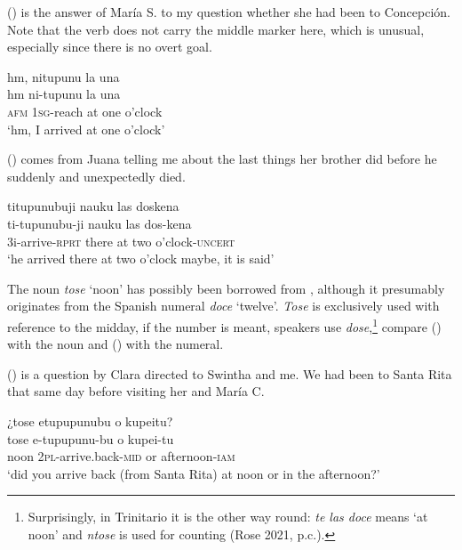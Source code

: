 () is the answer of María S. to my question whether she had been to Concepción. Note that the verb does not carry the middle marker here, which is unusual, especially since there is no overt goal.

\ea\label{ex:num-time-1}
\begingl
\glpreamble hm, nitupunu la una\\
\gla hm ni-tupunu {la una}\\
\glb \textsc{afm} 1\textsc{sg}-reach {at one o’clock}\\
\glft ‘hm, I arrived at one o’clock’
\endgl
\trailingcitation{[rxx-e120511l.002]}
\xe

() comes from Juana telling me about the last things her brother did before he suddenly and unexpectedly died.

\newpage

\ea\label{ex:num-time-2}
\begingl
\glpreamble titupunubuji nauku las doskena\\
\gla ti-tupunubu-ji nauku {las dos}-kena\\
\glb 3i-arrive-\textsc{rprt} there {at two o’clock}-\textsc{uncert}\\
\glft ‘he arrived there at two o’clock maybe, it is said’
\endgl
\trailingcitation{[jxx-p120430l-2.404]}
\xe

The noun \textit{tose} ‘noon’ has possibly been borrowed from , although it presumably originates from the Spanish numeral \textit{doce} ‘twelve’. \textit{Tose} is exclusively used with reference to the midday, if the number is meant, speakers use \textit{dose},\footnote{Surprisingly, in Trinitario it is the other way round: \textit{te las doce} means ‘at noon’ and \textit{ntose} is used for counting (Rose 2021, p.c.).} compare () with the noun and () with the numeral.

() is a question by Clara directed to Swintha and me. We had been to Santa Rita that same day before visiting her and María C.

\ea\label{ex:twelve-1}
\begingl
\glpreamble ¿tose etupupunubu o kupeitu?\\
\gla tose e-tupupunu-bu o kupei-tu\\
\glb noon 2\textsc{pl}-arrive.back-\textsc{mid} or afternoon-\textsc{iam}\\
\glft ‘did you arrive back (from Santa Rita) at noon or in the afternoon?’
\endgl
\trailingcitation{[cux-c120414ls-2.332]}
\xe

